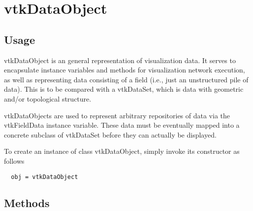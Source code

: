 \section{vtkDataObject}

\subsection{Usage}

 vtkDataObject is an general representation of visualization data. It serves
 to encapsulate instance variables and methods for visualization network 
 execution, as well as representing data consisting of a field (i.e., just
 an unstructured pile of data). This is to be compared with a vtkDataSet,
 which is data with geometric and/or topological structure.

 vtkDataObjects are used to represent arbitrary repositories of data via the
 vtkFieldData instance variable. These data must be eventually mapped into a
 concrete subclass of vtkDataSet before they can actually be displayed.


To create an instance of class vtkDataObject, simply
invoke its constructor as follows
\begin{verbatim}
  obj = vtkDataObject
\end{verbatim}
\subsection{Methods}

